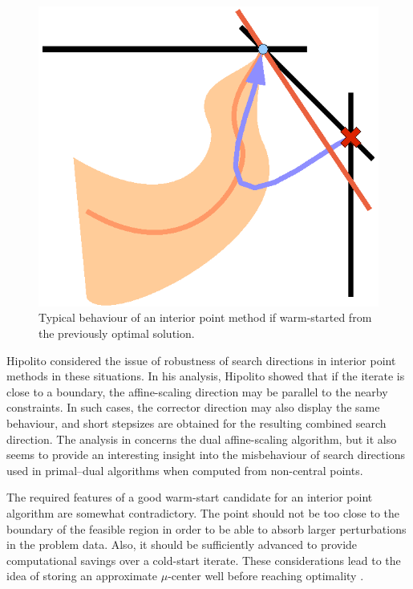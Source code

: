 \begin{figure}[h]
\centering
\includegraphics[scale=0.75]{figures/ws-behaviour.eps}
\caption{Typical behaviour of an interior point method if warm-started
         from the previously optimal solution.}
\label{fig:ws-behaviour}
\end{figure}

Hipolito \cite{Hipolito} considered the issue of robustness of 
search directions in interior point methods in these situations.
In his analysis, Hipolito showed that if the iterate is close 
to a boundary, the affine-scaling direction may be parallel to 
the nearby constraints. In such cases, the corrector direction 
may also display the same behaviour, and short stepsizes are 
obtained for the resulting combined search direction.
The analysis in \cite{Hipolito} concerns the
dual affine-scaling algorithm, but
it also seems to provide an interesting insight into the misbehaviour
of search directions used in primal--dual algorithms
when computed from non-central points.

The required features of a good warm-start candidate for an
interior point algorithm are somewhat contradictory.
The point should not be too close to the boundary of the feasible 
region in order to be able to absorb larger perturbations in the 
problem data. 
Also, it should be sufficiently advanced to provide 
computational savings over a cold-start iterate.
These considerations lead to the idea of storing an approximate
$\mu$-center well before reaching optimality 
\cite{Gondzio98,GondzioGrothey03,GondzioVial,YildirimWright}.

